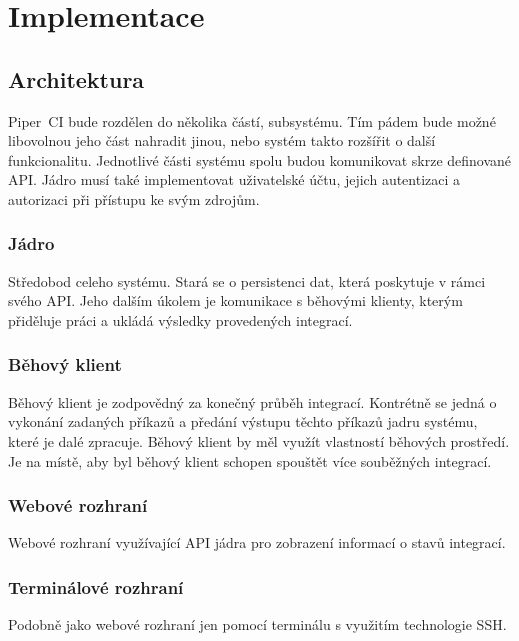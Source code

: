 \chapter{Implementace}

\section{Architektura}

Piper~CI bude rozdělen do několika částí, subsystému.
Tím pádem bude možné libovolnou jeho část nahradit jinou, nebo systém takto rozšířit o další funkcionalitu.
Jednotlivé části systému spolu budou komunikovat skrze definované API.
Jádro musí také implementovat uživatelské účtu, jejich autentizaci a autorizaci při přístupu ke svým zdrojům.

\subsection{Jádro}

Středobod celeho systému.
Stará se o persistenci dat, která poskytuje v rámci svého API.
Jeho dalším úkolem je komunikace s běhovými klienty, kterým přiděluje práci a ukládá výsledky provedených integrací.

\subsection{Běhový klient}

Běhový klient je zodpovědný za konečný průběh integrací.
Kontrétně se jedná o vykonání zadaných příkazů a předání výstupu těchto příkazů jadru systému, které je dalé zpracuje.
Běhový klient by měl využít vlastností běhových prostředí.
Je na místě, aby byl běhový klient schopen spouštět více souběžných integrací.

\subsection{Webové rozhraní}

Webové rozhraní využívající API jádra pro zobrazení informací o stavů integrací.

\subsection{Terminálové rozhraní}

Podobně jako webové rozhraní jen pomocí terminálu s využitím technologie SSH.

